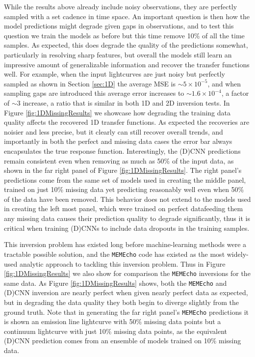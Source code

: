 \documentclass[floatfix,twocolumn,trackchanges,linenumbers]{aastex7}
\begin{document}
While the results above already include noisy observations, they are perfectly sampled with a set cadence in time space. An important question is then how the model predictions might degrade given gaps in observations, and to test this question we train the models as before but this time remove 10\% of all the time samples. As expected, this does degrade the quality of the predictions somewhat, particularly in resolving sharp features, but overall the models still learn an impressive amount of generalizable information and recover the transfer functions well. For example, when the input lightcurves are just noisy but perfectly sampled as shown in Section \ref{sec:1D} the average MSE is $\sim 5\times 10^{-5}$, and when sampling gaps are introduced this average error increases to $\sim 1.6\times 10^{-4}$, a factor of $\sim 3$ increase, a ratio that is similar in both 1D and 2D inversion tests. In Figure \ref{fig:1DMissingResults} we showcase how degrading the training data quality affects the recovered 1D transfer functions. As expected the 
recoveries are noisier and less precise, but it clearly can still recover overall trends, and importantly in both the perfect and missing data cases the error bar always encapsulates the true response function. Interestingly, the (D)CNN predictions remain consistent even when removing as much as 50\% of the input data, as shown in the far right panel of Figure \ref{fig:1DMissingResults}. The right panel's predictions come from the same set of models used in creating the middle panel, trained on just 10\% missing data yet predicting reasonably well even when 50\% of the data have been removed. This behavior does not extend to the models used in creating the left most panel, which were trained on perfect data\textemdash feeding them any missing data causes their prediction quality to degrade significantly, thus it is critical when training (D)CNNs to include data dropouts in the training samples.

This inversion problem has existed long before machine-learning methods were a tractable possible solution, and the \texttt{MEMEcho} \citep{MEMEcho1,MEMEcho2} code has existed as the most widely-used analytic approach to tackling this inversion problem. Thus in Figure \ref{fig:1DMissingResults} we also show for comparison the \texttt{MEMEcho} inversions for the same data. As Figure \ref{fig:1DMissingResults} shows, both the \texttt{MEMEcho} and (D)CNN inversion are nearly perfect when given nearly perfect data as expected, but in degrading the data quality they both begin to diverge slightly from the ground truth. Note that in generating the far right panel's \texttt{MEMEcho} predictions it is shown an emission line lightcurve with 50\% missing data points but a continuum lightcurve with just 10\% missing data points, as the equivalent (D)CNN prediction comes from an ensemble of models trained on 10\% missing data.
\end{document}
